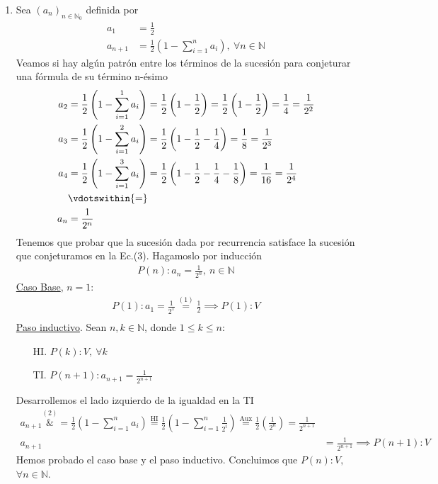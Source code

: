 \begin{enumerate}[label=\roman*)]
    \item Sea $(a_n)_{n \in \mathbb{N}_0}$ definida por
    \setcounter{equation}{0}
    \begin{align}
        a_1 &= \frac{1}{2} \\
        a_{n+1} &= \frac{1}{2}\left(1 - \sum_{i=1}^{n}a_i\right),\ \forall n \in \mathbb{N}
    \end{align}
    Veamos si hay algún patrón entre los términos de la sucesión para conjeturar una fórmula de su término 
    n-ésimo
    \begin{align}
        a_2 &= \frac{1}{2}\left(1 - \sum_{i=1}^{1}a_i\right) = \frac{1}{2}\left(1 - \frac{1}{2}\right) = \frac{1}{2}\left(1 - \frac{1}{2}\right) 
        = \frac{1}{4} = \frac{1}{2^2} \nonumber \\
        a_3 &= \frac{1}{2}\left(1 - \sum_{i=1}^{2}a_i\right) = \frac{1}{2}\left(1 - \frac{1}{2} - \frac{1}{4}\right) 
        = \frac{1}{8} = \frac{1}{2^3} \nonumber \\
        a_4 &= \frac{1}{2}\left(1 - \sum_{i=1}^{3}a_i\right) 
        = \frac{1}{2}\left(1 - \frac{1}{2} - \frac{1}{4} - \frac{1}{8}\right) 
        = \frac{1}{16} = \frac{1}{2^4} \nonumber \\
        &\vdotswithin{=} \nonumber \\
        a_n &= \frac{1}{2^n}
    \end{align}
    Tenemos que probar que la sucesión dada por recurrencia satisface la sucesión que conjeturamos en la Ec.(3). 
    Hagamoslo por inducción
    \begin{align*}
        P(n): a_n = \frac{1}{2^n}, \ n \in \mathbb{N}   
    \end{align*}
    \underline{Caso Base}, $n = 1$:
	\begin{align*}
		P(1): a_1 = \frac{1}{2^1} \overset{(1)}{=} \frac{1}{2} \implies P(1):V \\
	\end{align*}
	\underline{Paso inductivo}. Sean $n,k \in \mathbb{N}$, donde $1 \leq k \leq n$:
	\begin{enumerate}
        \item[HI.] $P(k):V,\ \forall k$
        \item[TI.] $P(n+1): a_{n+1} = \displaystyle \frac{1}{2^{n+1}}$
    \end{enumerate}
 	Desarrollemos el lado izquierdo de la igualdad en la TI
    \begin{align*}
  	    a_{n+1} \overset{(2)}&{=} \frac{1}{2}\left(1 - \sum_{i=1}^{n}a_i\right) \overset{\text{HI}}{=} 
        \frac{1}{2}\left(1 - \sum_{i=1}^{n}\frac{1}{2^i}\right)  \overset{\text{Aux}}{=}
        \frac{1}{2}\left(\frac{1}{2^n}\right) = \frac{1}{2^{n+1}} \\
        a_{n+1} &= \frac{1}{2^{n+1}} \implies P(n+1):V
    \end{align*}
    Hemos probado el caso base y el paso inductivo. Concluimos que $P(n):V,$ $\forall n \in \mathbb{N}$.


\end{enumerate}
